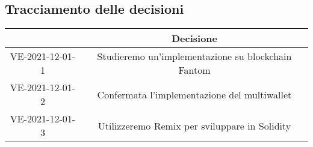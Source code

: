 \pagebreak

\subsection{Tracciamento delle decisioni}

\begin{table}[H]
	\centering
	\renewcommand{\arraystretch}{1.8}
	\begin{tabular}{c | c}
		\rowcolor[HTML]{125e28}
		\multicolumn{1}{c}{\color[HTML]{FFFFFF} \textbf{ID}} &
		\multicolumn{1}{c}{\color[HTML]{FFFFFF} \textbf{Decisione}} \\
		\hline
		VE-2021-12-01-1 & Studieremo un'implementazione su blockchain\glo{} Fantom\glo{}\\ \hline
		VE-2021-12-01-2 & Confermata l'implementazione del multiwallet\glo{}\\ \hline
		VE-2021-12-01-3 & Utilizzeremo Remix\glo{} per sviluppare in Solidity\glo{}\\

	\end{tabular}
\end{table}